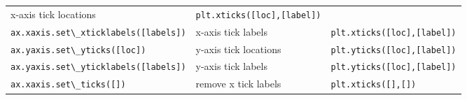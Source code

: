\documentclass{book}
\newcommand{\passthrough}[1]{#1}
\begin{document}
\begin{longtable}[]{@{}lll@{}}
\begin{minipage}[t]{0.30\columnwidth}
x-axis tick locations\strut
\end{minipage} & \begin{minipage}[t]{0.30\columnwidth}\raggedright
\passthrough{\lstinline!plt.xticks([loc],[label])!}\strut
\end{minipage}\tabularnewline
\begin{minipage}[t]{0.30\columnwidth}\raggedright
\passthrough{\lstinline!ax.xaxis.set\_xticklabels([labels])!}\strut
\end{minipage} & \begin{minipage}[t]{0.30\columnwidth}\raggedright
x-axis tick labels\strut
\end{minipage} & \begin{minipage}[t]{0.30\columnwidth}\raggedright
\passthrough{\lstinline!plt.xticks([loc],[label])!}\strut
\end{minipage}\tabularnewline
\begin{minipage}[t]{0.30\columnwidth}\raggedright
\passthrough{\lstinline!ax.yaxis.set\_yticks([loc])!}\strut
\end{minipage} & \begin{minipage}[t]{0.30\columnwidth}\raggedright
y-axis tick locations\strut
\end{minipage} & \begin{minipage}[t]{0.30\columnwidth}\raggedright
\passthrough{\lstinline!plt.yticks([loc],[label])!}\strut
\end{minipage}\tabularnewline
\begin{minipage}[t]{0.30\columnwidth}\raggedright
\passthrough{\lstinline!ax.yaxis.set\_yticklabels([labels])!}\strut
\end{minipage} & \begin{minipage}[t]{0.30\columnwidth}\raggedright
y-axis tick labels\strut
\end{minipage} & \begin{minipage}[t]{0.30\columnwidth}\raggedright
\passthrough{\lstinline!plt.yticks([loc],[label])!}\strut
\end{minipage}\tabularnewline
\begin{minipage}[t]{0.30\columnwidth}\raggedright
\passthrough{\lstinline!ax.xaxis.set\_ticks([])!}\strut
\end{minipage} & \begin{minipage}[t]{0.30\columnwidth}\raggedright
remove x tick labels\strut
\end{minipage} & \begin{minipage}[t]{0.30\columnwidth}\raggedright
\passthrough{\lstinline!plt.xticks([],[])!}\strut

\end{minipage}
\end{longtable}
\end{document}
